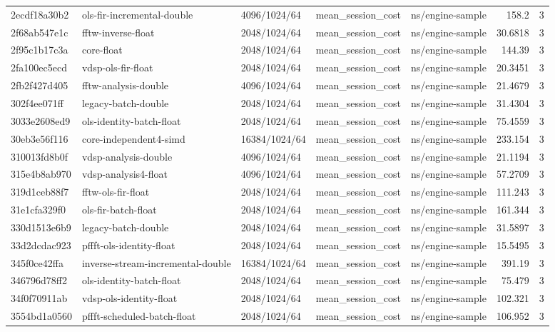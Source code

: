 \begin{longtable}{lllllrr}
2ecdf18a30b2 & ols-fir-incremental-double & 4096/1024/64 & mean\_session\_cost & ns/engine-sample & 158.2 & 3 \\
2f68ab547e1c & fftw-inverse-float & 2048/1024/64 & mean\_session\_cost & ns/engine-sample & 30.6818 & 3 \\
2f95c1b17c3a & core-float & 2048/1024/64 & mean\_session\_cost & ns/engine-sample & 144.39 & 3 \\
2fa100ec5ecd & vdsp-ols-fir-float & 2048/1024/64 & mean\_session\_cost & ns/engine-sample & 20.3451 & 3 \\
2fb2f427d405 & fftw-analysis-double & 4096/1024/64 & mean\_session\_cost & ns/engine-sample & 21.4679 & 3 \\
302f4ee071ff & legacy-batch-double & 2048/1024/64 & mean\_session\_cost & ns/engine-sample & 31.4304 & 3 \\
3033e2608ed9 & ols-identity-batch-float & 2048/1024/64 & mean\_session\_cost & ns/engine-sample & 75.4559 & 3 \\
30eb3e56f116 & core-independent4-simd & 16384/1024/64 & mean\_session\_cost & ns/engine-sample & 233.154 & 3 \\
310013fd8b0f & vdsp-analysis-double & 4096/1024/64 & mean\_session\_cost & ns/engine-sample & 21.1194 & 3 \\
315e4b8ab970 & vdsp-analysis4-float & 4096/1024/64 & mean\_session\_cost & ns/engine-sample & 57.2709 & 3 \\
319d1ceb88f7 & fftw-ols-fir-float & 2048/1024/64 & mean\_session\_cost & ns/engine-sample & 111.243 & 3 \\
31e1cfa329f0 & ols-fir-batch-float & 2048/1024/64 & mean\_session\_cost & ns/engine-sample & 161.344 & 3 \\
330d1513e6b9 & legacy-batch-double & 2048/1024/64 & mean\_session\_cost & ns/engine-sample & 31.5897 & 3 \\
33d2dcdac923 & pffft-ols-identity-float & 2048/1024/64 & mean\_session\_cost & ns/engine-sample & 15.5495 & 3 \\
345f0ce42ffa & inverse-stream-incremental-double & 16384/1024/64 & mean\_session\_cost & ns/engine-sample & 391.19 & 3 \\
346796d78ff2 & ols-identity-batch-float & 2048/1024/64 & mean\_session\_cost & ns/engine-sample & 75.479 & 3 \\
34f0f70911ab & vdsp-ols-identity-float & 2048/1024/64 & mean\_session\_cost & ns/engine-sample & 102.321 & 3 \\
3554bd1a0560 & pffft-scheduled-batch-float & 2048/1024/64 & mean\_session\_cost & ns/engine-sample & 106.952 & 3 \\

\end{longtable}
